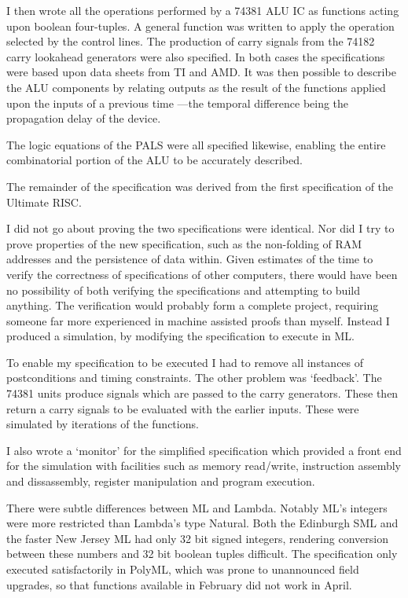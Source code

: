 I then wrote all the operations performed by a 74381 ALU IC as 
functions acting upon boolean four-tuples. A general function was 
written to apply the operation selected by the control lines.
 The production of carry signals from the 74182 carry lookahead generators were 
also specified. 
In both cases the specifications were based upon  
data sheets from TI and AMD. 
It was then possible to describe the ALU components by relating outputs as 
the result of the functions applied upon the inputs of a previous time 
---the temporal difference being the propagation delay of the device.

The logic equations of the PALS were all specified likewise, enabling the 
entire combinatorial portion of the ALU to be accurately described.

The remainder of the specification was derived from the first  specification of the Ultimate RISC. 
 
I did not go about proving the two specifications were identical.  
Nor did I 
 try to prove properties of the new specification, such as
the non-folding of 
RAM addresses and the persistence of data within. 
 Given estimates of 
the time to verify the correctness of specifications of other computers, 
there would have been no possibility of both verifying the specifications and 
attempting to build anything.
The verification would probably  form a complete project, 
requiring someone far more experienced in machine assisted proofs than myself.
Instead I  produced a simulation, by modifying the specification  to  execute in ML.

 To enable my 
specification to be executed I had to remove all instances of 
postconditions and timing constraints. 
The other problem was `feedback'.
The 74381 units produce signals which are 
passed to the carry generators. These then  return a carry signals to be evaluated with the earlier inputs. 
These were simulated by iterations of the functions.

I also wrote a `monitor' for the simplified specification which provided a 
front end for the simulation with facilities such as memory read/write, 
instruction assembly and dissassembly, register manipulation and 
program execution. 

There were  subtle differences between ML and Lambda. Notably ML's integers were more restricted than Lambda's type Natural.
 Both the Edinburgh SML and the faster New Jersey ML had only 32 bit signed integers, rendering conversion between these numbers and 32 bit boolean tuples difficult.
The specification only executed satisfactorily in PolyML,
which was   prone to unannounced field upgrades, so that functions   available in February did not work in April.



